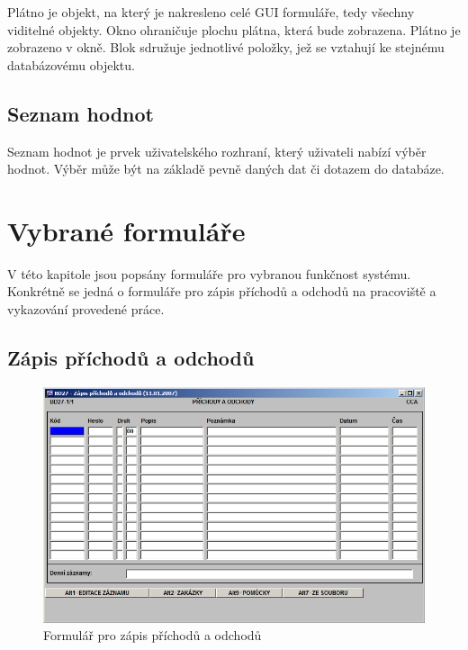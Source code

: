 \documentclass{diplomka}
\begin{document}
Plátno je objekt, na který je nakresleno celé GUI formuláře, tedy všechny viditelné objekty.  Okno ohraničuje plochu plátna, která bude zobrazena. Plátno je zobrazeno v okně. Blok sdružuje jednotlivé položky, jež se vztahují ke stejnému databázovému objektu.
\vspace{-3mm}
\subsection*{Seznam hodnot}
Seznam hodnot je prvek uživatelského rozhraní, který uživateli nabízí výběr hodnot. Výběr může být na základě pevně daných dat či dotazem do databáze.

\section{Vybrané formuláře}
V této kapitole jsou popsány formuláře pro vybranou funkčnost systému. 
 Konkrétně se jedná o formuláře pro zápis příchodů a odchodů na pracoviště a vykazování provedené práce.
\subsection{Zápis příchodů a odchodů}
\begin{figure}[H]
  \centering
  \includegraphics[scale=0.65]{obr/BD27.png}
\caption{Formulář pro zápis příchodů a odchodů}
\label{fig:att}
\end{figure}
\end{document}
